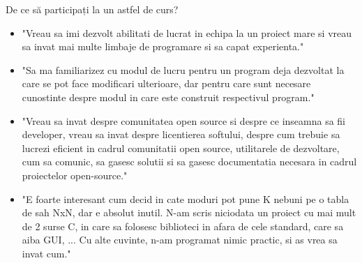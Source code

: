 \documentclass{beamer}
\begin{document}
\begin{frame}{De ce să participați la un astfel de curs?}
  \begin{itemize} %
  \item "Vreau sa imi dezvolt abilitati de lucrat in echipa la un proiect mare si vreau sa invat mai multe limbaje de programare si sa capat experienta."
  \pause
  \item "Sa ma familiarizez cu modul de lucru pentru un program deja dezvoltat la care se pot face modificari ulterioare, dar pentru care sunt necesare cunostinte despre modul in care este construit respectivul program." 
  \pause
  \item "Vreau sa invat despre comunitatea open source si despre ce inseamna sa fii developer, vreau sa invat despre licentierea softului, despre cum trebuie sa lucrezi eficient in cadrul comunitatii open source, utilitarele de dezvoltare, cum sa comunic, sa gasesc solutii si sa gasesc documentatia necesara in cadrul proiectelor open-source."
  \pause
  \item "E foarte interesant cum decid in cate moduri pot pune K nebuni pe o tabla de sah NxN, dar e absolut inutil. N-am scris niciodata un proiect cu mai mult de 2 surse C, in care sa folosesc biblioteci in afara de cele standard, care sa aiba GUI, ... Cu alte cuvinte, n-am programat nimic practic, si as vrea sa invat cum."
   \end{itemize}
\end{frame}
\end{document}
